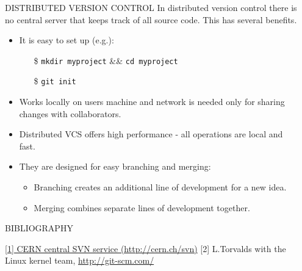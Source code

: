 \documentclass[final,hyperref={pdfpagelabels=false},notitlepage=true]{beamer}
\begin{document}
\begin{frame}{}
\begin{columns}[t]
\begin{column}{0.45\linewidth}
    \vskip4cm
    \begin{block}{\large DISTRIBUTED VERSION CONTROL}
      \vskip1cm
      In distributed version control there is {\color{orange} no central server}
      that keeps track of all source code. This has several benefits.
      \vskip1cm
      \begin{itemize}
        \item It is easy to set up (e.g.):
          \begin{itemize}
            \item[\$] {\tt mkdir myproject} \&\& {\tt cd myproject}
            \item[\$] {\tt git init}
          \end{itemize}
          \vskip1cm
        \item Works locally on users machine and network is needed
          only for sharing changes with collaborators.
          \vskip1cm
        \item Distributed VCS offers high performance - all operations are local and fast.
          \vskip1cm
        \item They are {\color{orange} designed for easy branching and merging}:
          \begin{itemize}
            \item Branching creates an additional line of
              development for a new idea.
            \item Merging combines separate lines of development
              together.
          \end{itemize}
      \end{itemize}
    \end{block}
\vskip6cm
\begin{block}{\large BIBLIOGRAPHY}
\begin{thebibliography}{9}
\href{http://cern.ch/svn}{[1] CERN central SVN service (http://cern.ch/svn)}
[2] L.Torvalds with the Linux kernel team, \href{http://git-scm.com/}{http://git-scm.com/}


\end{thebibliography}
\end{block}

    \end{column}
      \begin{column}{0.45\linewidth}


\end{column}
\end{columns}
\end{frame}
\end{document}
